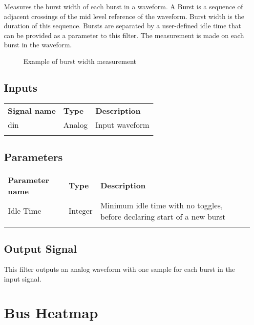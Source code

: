 Measures the burst width of each burst in a waveform. A Burst is a sequence of adjacent crossings of the mid level reference
of the waveform. Burst width is the duration of this sequence. Bursts are separated by a user-defined idle time that can be
provided as a parameter to this filter. The measurement is made on each burst in the waveform.

\begin{figure}[h]
	\centering
	\caption{Example of burst width measurement}
	\label{filter_burstwidth}
	\end{figure}

\subsection{Inputs}

\begin{tabularx}{16cm}{llX}
\thickhline
\textbf{Signal name} & \textbf{Type} & \textbf{Description} \\
\thickhline
din & Analog & Input waveform \\
\thickhline
\end{tabularx}

\subsection{Parameters}

\begin{tabularx}{16cm}{llX}
\thickhline
\textbf{Parameter name} & \textbf{Type} & \textbf{Description} \\
\thickhline
Idle Time & Integer & Minimum idle time with no toggles, before declaring start of a new burst\\
\thickhline
\end{tabularx}

\subsection{Output Signal}

This filter outputs an analog waveform with one sample for each burst in the input signal.

\pagebreak
\section{Bus Heatmap}


